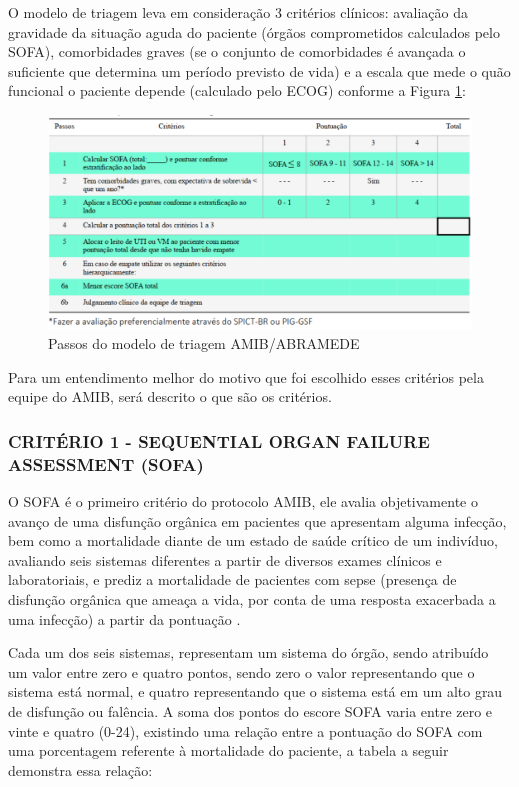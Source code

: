 \documentclass[12pt]{article}
\begin{document}
O modelo de triagem leva em consideração 3 critérios clínicos: avaliação da gravidade da situação aguda do paciente (órgãos comprometidos calculados pelo SOFA), comorbidades graves (se o conjunto de comorbidades é avançada o suficiente que determina um período previsto de vida) e a escala que mede o quão funcional o paciente depende (calculado pelo ECOG) conforme a Figura \ref{Passos-modelo-triagem-AMIB-ABRAMEDE}:

\begin{figure}[H]
    \centering
    \includegraphics[scale=0.5]{img/Tabela de pontuacoes e criterios.png}
    \centering
    \caption{Passos do modelo de triagem AMIB/ABRAMEDE \cite{kretzer2020recomendaccoes}}
    \label{Passos-modelo-triagem-AMIB-ABRAMEDE}
\end{figure}

Para um entendimento melhor do motivo que foi escolhido esses critérios pela equipe do AMIB, será descrito o que são os critérios.

\subsubsection{CRITÉRIO 1 - SEQUENTIAL ORGAN FAILURE ASSESSMENT (SOFA)}

O SOFA é o primeiro critério do protocolo AMIB, ele avalia objetivamente o avanço de uma disfunção orgânica em pacientes que apresentam alguma infecção, bem como a mortalidade diante de um estado de saúde crítico de um indivíduo, avaliando seis sistemas diferentes a partir de diversos exames clínicos e laboratoriais, e prediz a mortalidade de pacientes com sepse (presença de disfunção orgânica que ameaça a vida, por conta de uma resposta exacerbada a uma infecção) a partir da pontuação \cite{lambden2019sofa}.

Cada um dos seis sistemas, representam um sistema do órgão, sendo atribuído um valor entre zero e quatro pontos, sendo zero o valor representando que o sistema está normal, e quatro representando que o sistema está em um alto grau de disfunção ou falência. A soma dos pontos do escore SOFA varia entre zero e vinte e quatro (0-24), existindo uma relação entre a pontuação do SOFA com uma porcentagem referente à mortalidade do paciente, a tabela a seguir demonstra essa relação:
\end{document}
